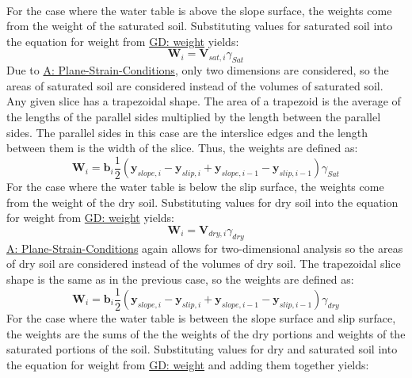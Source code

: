 \documentclass[12pt]{article}
\begin{document}
\paragraph{}
\label{GD:sliceWghtDeriv}
For the case where the water table is above the slope surface, the weights come from the weight of the saturated soil. Substituting values for saturated soil into the equation for weight from \hyperref[GD:weight]{GD: weight} yields:
\begin{displaymath}
{\mathbf{W}}_{i}={\mathbf{V}_{sat,i}} {γ_{Sat}}
\end{displaymath}
Due to \hyperref[assumpPSC]{A: Plane-Strain-Conditions}, only two dimensions are considered, so the areas of saturated soil are considered instead of the volumes of saturated soil. Any given slice has a trapezoidal shape. The area of a trapezoid is the average of the lengths of the parallel sides multiplied by the length between the parallel sides. The parallel sides in this case are the interslice edges and the length between them is the width of the slice. Thus, the weights are defined as:
\begin{displaymath}
{\mathbf{W}}_{i}={\mathbf{b}}_{i} \frac{1}{2} \left({\mathbf{y}_{slope,i}}-{\mathbf{y}_{slip,i}}+{\mathbf{y}_{slope,i-1}}-{\mathbf{y}_{slip,i-1}}\right) {γ_{Sat}}
\end{displaymath}
For the case where the water table is below the slip surface, the weights come from the weight of the dry soil. Substituting values for dry soil into the equation for weight from \hyperref[GD:weight]{GD: weight} yields:
\begin{displaymath}
{\mathbf{W}}_{i}={\mathbf{V}_{dry,i}} {γ_{dry}}
\end{displaymath}
\hyperref[assumpPSC]{A: Plane-Strain-Conditions} again allows for two-dimensional analysis so the areas of dry soil are considered instead of the volumes of dry soil. The trapezoidal slice shape is the same as in the previous case, so the weights are defined as:
\begin{displaymath}
{\mathbf{W}}_{i}={\mathbf{b}}_{i} \frac{1}{2} \left({\mathbf{y}_{slope,i}}-{\mathbf{y}_{slip,i}}+{\mathbf{y}_{slope,i-1}}-{\mathbf{y}_{slip,i-1}}\right) {γ_{dry}}
\end{displaymath}
For the case where the water table is between the slope surface and slip surface, the weights are the sums of the the weights of the dry portions and weights of the saturated portions of the soil. Substituting values for dry and saturated soil into the equation for weight from \hyperref[GD:weight]{GD: weight} and adding them together yields:
\end{document}
